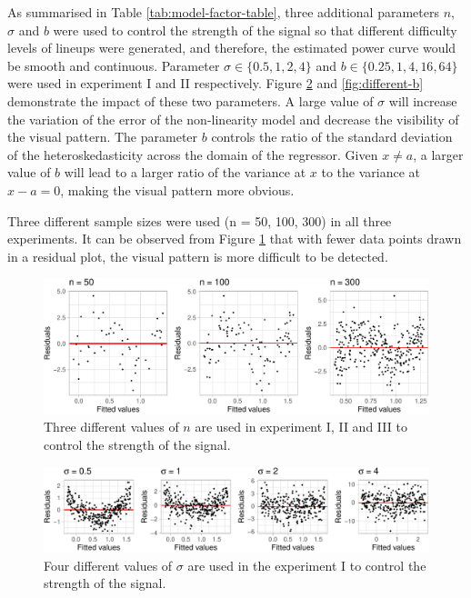 \documentclass[]{interact}
\theoremstyle{plain}%
\theoremstyle{definition}
\theoremstyle{remark}
\begin{document}
As summarised in Table \ref{tab:model-factor-table}, three additional
parameters \(n\), \(\sigma\) and \(b\) were used to control the strength
of the signal so that different difficulty levels of lineups were
generated, and therefore, the estimated power curve would be smooth and
continuous. Parameter \(\sigma \in \{0.5, 1, 2, 4\}\) and
\(b \in \{0.25, 1, 4, 16, 64\}\) were used in experiment I and II
respectively. Figure \ref{fig:different-sigma} and \ref{fig:different-b}
demonstrate the impact of these two parameters. A large value of
\(\sigma\) will increase the variation of the error of the non-linearity
model and decrease the visibility of the visual pattern. The parameter
\(b\) controls the ratio of the standard deviation of the
heteroskedasticity across the domain of the regressor. Given
\(x \neq a\), a larger value of \(b\) will lead to a larger ratio of the
variance at \(x\) to the variance at \(x - a = 0\), making the visual
pattern more obvious.

Three different sample sizes were used (n = 50, 100, 300) in all three
experiments. It can be observed from Figure \ref{fig:different-n} that
with fewer data points drawn in a residual plot, the visual pattern is
more difficult to be detected.

\begin{figure}

{\centering \includegraphics[width=1\linewidth]{paper_comparison_files/figure-latex/different-n-1} 

}

\caption{Three different values of $n$ are used in experiment I, II and III to control the strength of the signal.}\label{fig:different-n}
\end{figure}

\begin{figure}

{\centering \includegraphics[width=1\linewidth]{paper_comparison_files/figure-latex/different-sigma-1} 

}

\caption{Four different values of $\sigma$ are used in the experiment I to control the strength of the signal.}\label{fig:different-sigma}
\end{figure}
\end{document}
